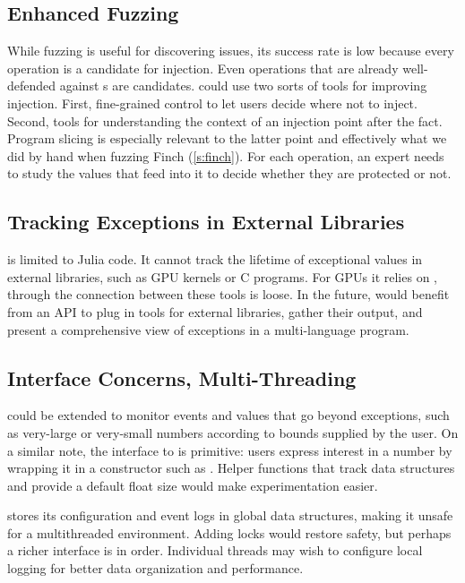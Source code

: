 \documentclass{juliacon}
\begin{document}
\subsection{Enhanced Fuzzing}

While fuzzing is useful for discovering issues, its success rate
is low because {every} \fp{} operation is a candidate
for injection.
Even operations that are already well-defended against \NaN{}s are candidates.
\TF{} could use two sorts of tools for improving injection.
First, fine-grained control to let users decide where not to inject.
Second, tools for understanding the context of an injection point
after the fact.
Program slicing is especially relevant to the latter point and effectively
what we did by hand when fuzzing Finch (\cref{s:finch}).
For each operation, an expert needs to study the values that feed into it to
decide whether they are protected or not.


\subsection{Tracking Exceptions in External Libraries}

\TF{} is limited to Julia code.
It cannot track the lifetime of exceptional values in external libraries, such as GPU kernels or C programs.
For GPUs it relies on \GPUFPX{}, through the connection between these tools is loose.
In the future, \TF{} would benefit from an API to plug in tools for external libraries, gather their output,
and present a comprehensive view of exceptions in a multi-language program.


\subsection{Interface Concerns, Multi-Threading}

\TF{} could be extended to monitor events and values that go beyond exceptions,
such as very-large or very-small numbers according to bounds supplied by the user.
On a similar note, the interface to \TF{} is primitive: users express interest in a number by wrapping it
in a constructor such as .
Helper functions that track data structures and provide a default float size would
make experimentation easier.

\TF{} stores its configuration and event logs in global data structures,
making it unsafe for a multithreaded environment.
Adding locks would restore safety, but perhaps a richer interface is in order.
Individual threads may wish to configure local logging for better
data organization and performance.
\end{document}
